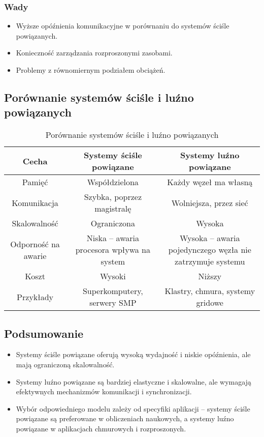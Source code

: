 \subsubsection{Wady}
\begin{itemize}
    \item Wyższe opóźnienia komunikacyjne w porównaniu do systemów ściśle powiązanych.
    \item Konieczność zarządzania rozproszonymi zasobami.
    \item Problemy z równomiernym podziałem obciążeń.
\end{itemize}

\subsection{Porównanie systemów ściśle i luźno powiązanych}

\begin{table}[h]
    \centering
    \renewcommand{\arraystretch}{1.3}
    \begin{tabular}{|c|c|c|}
        \hline
        \textbf{Cecha} & \textbf{Systemy ściśle powiązane} & \textbf{Systemy luźno powiązane} \\
        \hline
        Pamięć & Współdzielona & Każdy węzeł ma własną \\
        \hline
        Komunikacja & Szybka, poprzez magistralę & Wolniejsza, przez sieć \\
        \hline
        Skalowalność & Ograniczona & Wysoka \\
        \hline
        Odporność na awarie & Niska – awaria procesora wpływa na system & Wysoka – awaria pojedynczego węzła nie zatrzymuje systemu \\
        \hline
        Koszt & Wysoki & Niższy \\
        \hline
        Przykłady & Superkomputery, serwery SMP & Klastry, chmura, systemy gridowe \\
        \hline
    \end{tabular}
    \caption{Porównanie systemów ściśle i luźno powiązanych}
\end{table}

\subsection{Podsumowanie}
\begin{itemize}
    \item Systemy ściśle powiązane oferują wysoką wydajność i niskie opóźnienia, ale mają ograniczoną skalowalność.
    \item Systemy luźno powiązane są bardziej elastyczne i skalowalne, ale wymagają efektywnych mechanizmów komunikacji i synchronizacji.
    \item Wybór odpowiedniego modelu zależy od specyfiki aplikacji – systemy ściśle powiązane są preferowane w obliczeniach naukowych, a systemy luźno powiązane w aplikacjach chmurowych i rozproszonych.
\end{itemize}
